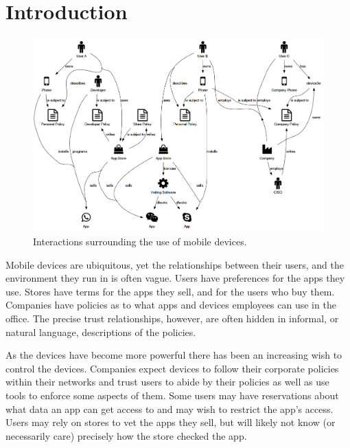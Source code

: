 \documentclass[thesis.tex]{subfiles}
\begin{document}
\chapter{Introduction}

%

\begin{figure}
  \centering
  \includegraphics[width=\linewidth]{figures/mobile-ecosystem.png}
  \caption{Interactions surrounding the use of mobile devices.}
  \label{fig:mobile-ecosystem}
\end{figure}

Mobile devices are ubiquitous, yet the relationships between their users, and
the environment they run in is often vague. Users have preferences for the apps
they use. Stores have terms for the apps they sell, and for the users who buy
them. Companies have policies as to what apps and devices employees can use in
the office. The precise trust relationships, however, are often hidden in
informal, or natural language, descriptions of the policies.

As the devices have become more powerful there has been an increasing wish to
control the devices. Companies expect devices to follow their corporate policies
within their networks and trust users to abide by their policies as well as use
tools to enforce some aspects of them. Some users may have reservations about
what data an app can get access to and may wish to restrict the app's access.
Users may rely on stores to vet the apps they sell, but will likely not know (or
necessarily care) precisely how the store checked the app.
\end{document}
